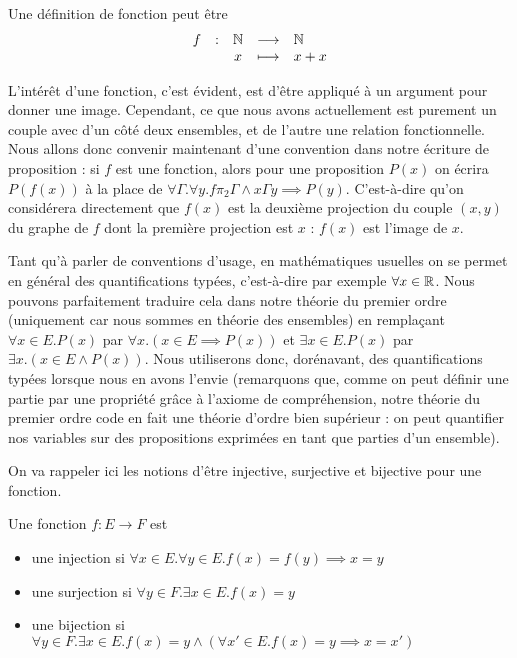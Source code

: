 \begin{expl}
    Une définition de fonction peut être $$\begin{array}{rcccl} f & : & \mathbb{N} &\longrightarrow & \mathbb{N}\\ & &x & \longmapsto & x+x\end{array}$$
\end{expl}

L'intérêt d'une fonction, c'est évident, est d'être appliqué à un argument pour donner une image. Cependant, ce que nous avons actuellement est purement un couple avec d'un côté deux ensembles, et de l'autre une relation fonctionnelle. Nous allons donc convenir maintenant d'une convention dans notre écriture de proposition : si $f$ est une fonction, alors pour une proposition $P(x)$ on écrira $P(f(x))$ à la place de $\forall \Gamma.\forall y.f\pi_2 \Gamma\land x\Gamma y \implies P(y)$. C'est-à-dire qu'on considérera directement que $f(x)$ est la deuxième projection du couple $(x,y)$ du graphe de $f$ dont la première projection est $x$ : $f(x)$ est l'image de $x$.

\begin{rmk}
    Tant qu'à parler de conventions d'usage, en mathématiques usuelles on se permet en général des quantifications typées, c'est-à-dire par exemple $\forall x\in\mathbb{R}$. Nous pouvons parfaitement traduire cela dans notre théorie du premier ordre (uniquement car nous sommes en théorie des ensembles) en remplaçant $\forall x\in E. P(x)$ par $\forall x. (x\in E \implies P(x))$ et $\exists x\in E. P(x)$ par $\exists x.(x\in E\land P(x))$. Nous utiliserons donc, dorénavant, des quantifications typées lorsque nous en avons l'envie (remarquons que, comme on peut définir une partie par une propriété grâce à l'axiome de compréhension, notre théorie du premier ordre code en fait une théorie d'ordre bien supérieur : on peut quantifier nos variables sur des propositions exprimées en tant que parties d'un ensemble).
\end{rmk}

On va rappeler ici les notions d'être injective, surjective et bijective pour une fonction.

\begin{defi}
    Une fonction $f : E \to F$ est 
    \begin{itemize}[label=$\bullet$]
        \item une injection si $\forall x\in E.\forall y\in E.f(x)=f(y)\implies x=y$
        \item une surjection si $\forall y\in F.\exists x\in E. f(x)=y$
        \item une bijection si $\forall y\in F.\exists x\in E. f(x)=y\land (\forall x'\in E. f(x)=y\implies x=x')$
    \end{itemize}
\end{defi}

